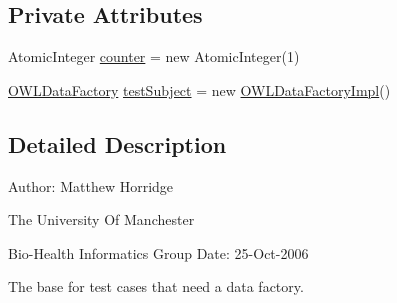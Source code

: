 \subsection*{Private Attributes}
\begin{DoxyCompactItemize}
\item 
Atomic\-Integer \hyperlink{classorg_1_1semanticweb_1_1owlapi_1_1datafactory_1_1_o_w_l_data_factory_test_case_a3f8c61412e7dfa0b0e5a5e79a84531d0}{counter} = new Atomic\-Integer(1)
\item 
\hyperlink{interfaceorg_1_1semanticweb_1_1owlapi_1_1model_1_1_o_w_l_data_factory}{O\-W\-L\-Data\-Factory} \hyperlink{classorg_1_1semanticweb_1_1owlapi_1_1datafactory_1_1_o_w_l_data_factory_test_case_ac5376984f3b758b3d71ae29317676a13}{test\-Subject} = new \hyperlink{classuk_1_1ac_1_1manchester_1_1cs_1_1owl_1_1owlapi_1_1_o_w_l_data_factory_impl}{O\-W\-L\-Data\-Factory\-Impl}()
\end{DoxyCompactItemize}


\subsection{Detailed Description}
Author\-: Matthew Horridge\par
 The University Of Manchester\par
 Bio-\/\-Health Informatics Group Date\-: 25-\/\-Oct-\/2006 

The base for test cases that need a data factory. 

